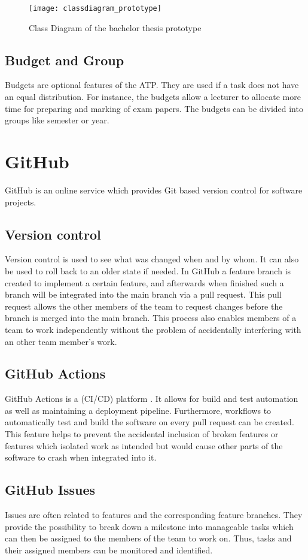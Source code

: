 \begin{figure}[H]
	\centering
	\texttt{[image: classdiagram\_prototype]}
	\caption{Class Diagram of the bachelor thesis prototype}
	\label{figure3}
\end{figure}

\subsection{Budget and Group}
Budgets are optional features of the ATP. They are used if a task does not have an equal distribution. For instance, the budgets allow a lecturer to allocate more time for preparing and marking of exam papers. The budgets can be divided into groups like semester or year.

\section{GitHub} \label{GitHub}
GitHub \cite{github_url} is an online service which provides Git \cite{git_url} based version control for software projects.
\subsection{Version control} \label{Version control}
Version control is used to see what was changed when and by whom. It can also be used to roll back to an older state if needed. In GitHub a feature branch is created to implement a certain feature, and afterwards when finished such a branch will be integrated into the main branch via a pull request. This pull request allows the other members of the team to request changes before the branch is merged into the main branch. This process also enables members of a team to work independently without the problem of accidentally interfering with an other team member's work.
\subsection{GitHub Actions} \label{GitHub Actions}
GitHub Actions is a (CI/CD) platform \cite{github_actions_url}. It allows for build and test automation as well as maintaining a deployment pipeline. Furthermore, workflows to automatically test and build the software on every pull request can be created. This feature helps to prevent the accidental inclusion of broken features or features which isolated work as intended but would cause other parts of the software to crash when integrated into it.
\subsection{GitHub Issues} \label{GitHub Issues}
Issues are often related to features and the corresponding feature branches. They provide the possibility to break down a milestone into manageable tasks which can then be assigned to the members of the team to work on. Thus, tasks and their assigned members can be monitored and identified. 

